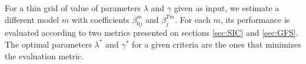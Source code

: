 For a thin grid of value of parameters $\lambda$ and $\gamma$ given as input, we estimate a different model $m$ with coefficients $\beta_{0j}^m$ and $\beta_j^{Tm}$. For each $m$, its performance is evaluated according to two metrics presented on sections \ref{sec:SIC} and \ref{sec:GFS}.
The optimal parameters $\lambda^*$ and $\gamma^*$ for a given criteria are the ones that minimizes the evaluation metric.





